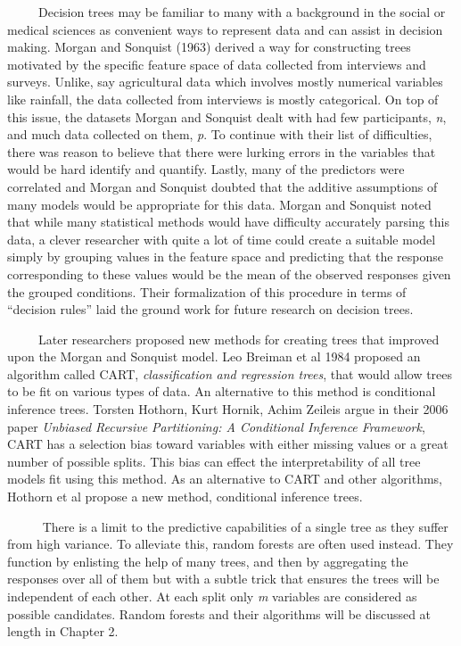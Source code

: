 \documentclass[12pt,twoside]{reedthesis}
\begin{document}
  ~~~~~Decision trees may be familiar to many with a background in the
  social or medical sciences as convenient ways to represent data and can
  assist in decision making. Morgan and Sonquist (1963) derived a way for
  constructing trees motivated by the specific feature space of data
  collected from interviews and surveys. Unlike, say agricultural data
  which involves mostly numerical variables like rainfall, the data
  collected from interviews is mostly categorical. On top of this issue,
  the datasets Morgan and Sonquist dealt with had few participants,
  \emph{n}, and much data collected on them, \emph{p}. To continue with
  their list of difficulties, there was reason to believe that there were
  lurking errors in the variables that would be hard identify and
  quantify. Lastly, many of the predictors were correlated and Morgan and
  Sonquist doubted that the additive assumptions of many models would be
  appropriate for this data. Morgan and Sonquist noted that while many
  statistical methods would have difficulty accurately parsing this data,
  a clever researcher with quite a lot of time could create a suitable
  model simply by grouping values in the feature space and predicting that
  the response corresponding to these values would be the mean of the
  observed responses given the grouped conditions. Their formalization of
  this procedure in terms of ``decision rules'' laid the ground work for
  future research on decision trees.
  
  ~~~~~Later researchers proposed new methods for creating trees that
  improved upon the Morgan and Sonquist model. Leo Breiman et al 1984
  proposed an algorithm called CART, \emph{classification and regression
  trees}, that would allow trees to be fit on various types of data. An
  alternative to this method is conditional inference trees. Torsten
  Hothorn, Kurt Hornik, Achim Zeileis argue in their 2006 paper
  \emph{Unbiased Recursive Partitioning: A Conditional Inference
  Framework}, CART has a selection bias toward variables with either
  missing values or a great number of possible splits. This bias can
  effect the interpretability of all tree models fit using this method. As
  an alternative to CART and other algorithms, Hothorn et al propose a new
  method, conditional inference trees.
  
  ~~~~~ There is a limit to the predictive capabilities of a single tree
  as they suffer from high variance. To alleviate this, random forests are
  often used instead. They function by enlisting the help of many trees,
  and then by aggregating the responses over all of them but with a subtle
  trick that ensures the trees will be independent of each other. At each
  split only \emph{m} variables are considered as possible candidates.
  Random forests and their algorithms will be discussed at length in
  Chapter 2.
  
\end{document}
